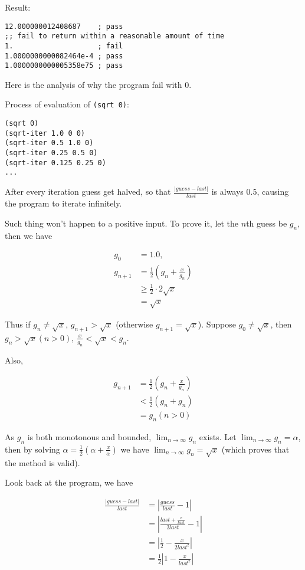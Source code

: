 \documentclass[../main.tex]{subfiles}
\begin{document}
Result:

\begin{lstlisting}
12.000000012408687    ; pass
;; fail to return within a reasonable amount of time
1.                    ; fail
1.0000000000082464e-4 ; pass
1.0000000000005358e75 ; pass
\end{lstlisting}

Here is the analysis of why the program fail with 0.

Process of evaluation of \lstinline{(sqrt 0)}:

\begin{lstlisting}
(sqrt 0)
(sqrt-iter 1.0 0 0)
(sqrt-iter 0.5 1.0 0)
(sqrt-iter 0.25 0.5 0)
(sqrt-iter 0.125 0.25 0)
...
\end{lstlisting}

After every iteration guess get halved, so that
 $\frac{|guess-last|}{last}$ is always 0.5,
 causing the program to iterate infinitely.

Such thing won't happen to a positive input. To prove it, let
 the $n$th guess be $g_n$, then we have
 
\begin{align*}
g_0 &= 1.0, \\
g_{n+1} &= \frac{1}{2}(g_n+\frac{x}{g_n}) \\
&\geq \frac{1}{2}\cdot2\sqrt{x} \\
&= \sqrt{x}
\end{align*}

Thus if $g_n \neq \sqrt{x}$, $g_{n+1} > \sqrt{x}$ (otherwise $g_{n+1} = \sqrt{x}$).
 Suppose $g_0 \neq \sqrt{x}$, then $g_n > \sqrt{x} (n > 0)$, $\frac{x}{g_n} <
 \sqrt{x} < g_n$.

Also,

\begin{align*}
g_{n+1} &= \frac{1}{2}(g_n+\frac{x}{g_n}) \\
&< \frac{1}{2}(g_n+g_n) \\
&= g_n (n > 0)
\end{align*}

As $g_n$ is both monotonous and bounded, $\lim_{n \to \infty}g_n$ exists.
 Let $\lim_{n \to \infty}g_n = \alpha$, then by solving
 $\alpha = \frac{1}{2}(\alpha+\frac{x}{\alpha})$ we have
 $\lim_{n \to \infty}g_n = \sqrt{x}$ (which proves that the method is valid).

Look back at the program, we have

\begin{align*}
\frac{|guess-last|}{last} &= |\frac{guess}{last} - 1| \\
&= |\frac{last + \frac{x}{last}}{2 last} - 1| \\
&= |\frac{1}{2} - \frac{x}{2 last^2}| \\
&= \frac{1}{2}|1-\frac{x}{last^2}|
\end{align*}
\end{document}
